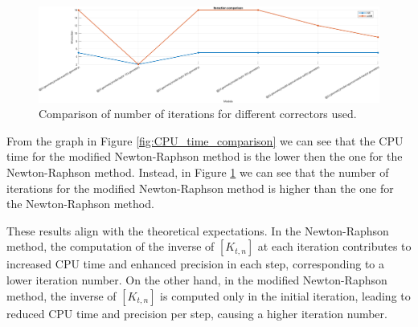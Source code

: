 \begin{figure}[H]
    \centering
    \includegraphics[width=.9\textwidth]{img/iterations_comparison}
    \caption{Comparison of number of iterations for different correctors used.}
    \label{fig:iterations_comparison}
\end{figure}

From the graph in Figure \ref{fig:CPU_time_comparison} we can see that the CPU time for the modified Newton-Raphson method is the lower then the one for the Newton-Raphson method.
Instead, in Figure \ref{fig:iterations_comparison} we can see that the number of iterations for the modified Newton-Raphson method is higher than the one for the Newton-Raphson method.

These results align with the theoretical expectations.
In the Newton-Raphson method, the computation of the inverse of $[K_{t,n}]$ at each iteration contributes to increased CPU time and enhanced precision in each step, corresponding to a lower iteration number.
On the other hand, in the modified Newton-Raphson method, the inverse of $[K_{t,n}]$ is computed only in the initial iteration, leading to reduced CPU time and precision per step, causing a higher iteration number.